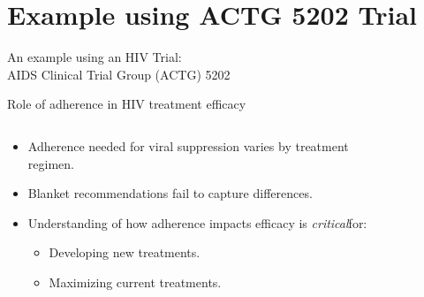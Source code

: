 \documentclass{beamer}
\begin{document}
\section{Example using ACTG 5202 Trial}

\begin{frame}
    \huge
    \centering
    An example using an HIV Trial: \\
   
    AIDS Clinical Trial Group (ACTG) 5202
\end{frame}

\begin{frame}{Role of adherence in HIV treatment efficacy}
    \begin{columns}
    \begin{column}{0.5\textwidth}
        \begin{itemize}
            \item Adherence needed for viral suppression varies by treatment regimen.
            \item Blanket recommendations fail to capture differences.
            \item[\ding{43}] Understanding of how adherence impacts efficacy is \textit{critical}\footnotemark[1] for:
            \begin{itemize}
                \item Developing new treatments.
                \item Maximizing current treatments.
            \end{itemize}
        \end{itemize}
    \end{column}
    \begin{column}{0.5\textwidth}
    \begin{figure}
        \centering

\end{figure}
\end{column}
\end{columns}
\end{frame}
\end{document}
